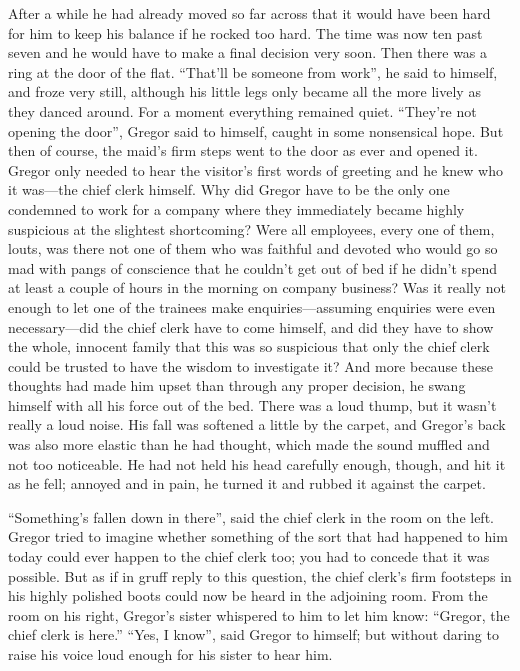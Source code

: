 After a while he had already moved so far across that it would have
been hard for him to keep his balance if he rocked too hard. The time
was now ten past seven and he would have to make a final decision very
soon. Then there was a ring at the door of the flat. “That’ll be
someone from work”, he said to himself, and froze very still, although
his little legs only became all the more lively as they danced around.
For a moment everything remained quiet. “They’re not opening the door”,
Gregor said to himself, caught in some nonsensical hope. But then of
course, the maid’s firm steps went to the door as ever and opened it.
Gregor only needed to hear the visitor’s first words of greeting and he
knew who it was—the chief clerk himself. Why did Gregor have to be the
only one condemned to work for a company where they immediately became
highly suspicious at the slightest shortcoming? Were all employees,
every one of them, louts, was there not one of them who was faithful
and devoted who would go so mad with pangs of conscience that he
couldn’t get out of bed if he didn’t spend at least a couple of hours
in the morning on company business? Was it really not enough to let one
of the trainees make enquiries—assuming enquiries were even
necessary—did the chief clerk have to come himself, and did they have
to show the whole, innocent family that this was so suspicious that
only the chief clerk could be trusted to have the wisdom to investigate
it? And more because these thoughts had made him upset than through any
proper decision, he swang himself with all his force out of the bed.
There was a loud thump, but it wasn’t really a loud noise. His fall was
softened a little by the carpet, and Gregor’s back was also more
elastic than he had thought, which made the sound muffled and not too
noticeable. He had not held his head carefully enough, though, and hit
it as he fell; annoyed and in pain, he turned it and rubbed it against
the carpet.

“Something’s fallen down in there”, said the chief clerk in the room on
the left. Gregor tried to imagine whether something of the sort that
had happened to him today could ever happen to the chief clerk too; you
had to concede that it was possible. But as if in gruff reply to this
question, the chief clerk’s firm footsteps in his highly polished boots
could now be heard in the adjoining room. From the room on his right,
Gregor’s sister whispered to him to let him know: “Gregor, the chief
clerk is here.” “Yes, I know”, said Gregor to himself; but without
daring to raise his voice loud enough for his sister to hear him.

